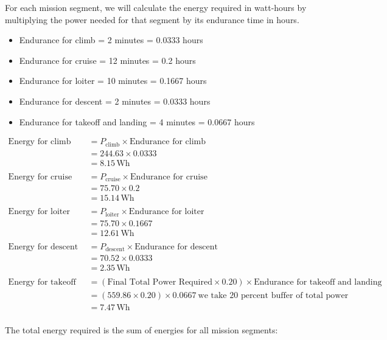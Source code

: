 \documentclass[12 pt]{article}
\begin{document}
For each mission segment, we will calculate the energy required in watt-hours by multiplying the power needed for that segment by its endurance time in hours.

\begin{itemize}
    \item Endurance for climb = 2 minutes = 0.0333 hours
    \item Endurance for cruise = 12 minutes = 0.2 hours
    \item Endurance for loiter = 10 minutes = 0.1667 hours
    \item Endurance for descent = 2 minutes = 0.0333 hours
    \item Endurance for takeoff and landing = 4 minutes = 0.0667 hours
\end{itemize}

\begin{align*}
\text{Energy for climb} &= P_{\text{climb}} \times \text{Endurance for climb} \\
&= 244.63 \times 0.0333 \\
&= 8.15 \, \text{Wh} \\
\\
\text{Energy for cruise} &= P_{\text{cruise}} \times \text{Endurance for cruise} \\
&= 75.70 \times 0.2 \\
&= 15.14 \, \text{Wh} \\
\\
\text{Energy for loiter} &= P_{\text{loiter}} \times \text{Endurance for loiter} \\
&= 75.70 \times 0.1667 \\
&= 12.61 \, \text{Wh} \\
\\
\text{Energy for descent} &= P_{\text{descent}} \times \text{Endurance for descent} \\
&= 70.52 \times 0.0333 \\
&= 2.35 \, \text{Wh} \\
\\
\text{Energy for takeoff and landing} &= (\text{Final Total Power Required} \times 0.20) \times \text{Endurance for takeoff and landing} \\
&= (559.86 \times 0.20) \times 0.0667 \   \text{we take 20 percent buffer of total power}  \\
&= 7.47 \, \text{Wh} \\
\end{align*}

The total energy required is the sum of energies for all mission segments:
\end{document}
